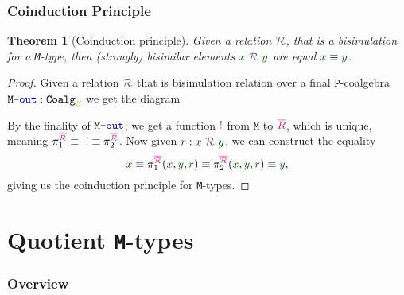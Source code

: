 \documentclass[xelatex,mathserif,serif,notheorems]{beamer} %
\theoremstyle{plain} %
\newtheorem{thm}{Theorem}[section]
\theoremstyle{definition}
\theoremstyle{remark}
\newcommand*{\term}[1]{\textcolor{green!30!black}{#1}} %
\newcommand*{\type}[1]{\textcolor{magenta!90!black}{#1}}
\newcommand*{\container}[1]{\textcolor{orange}{#1}}
\newcommand*{\coalg}[2]{#1\texttt{-}#2}
\newcommand*{\relation}[1]{\textcolor{gray!75!black}{\ensuremath{\mathtt{#1}}}}
\newcommand*{\constant}[1]{\textcolor{orange!60!black}{\ensuremath{\mathtt{#1}}}}
\newcommand*{\function}[1]{\textcolor{blue!60!black}{\ensuremath{\mathtt{#1}}}}
\newcommand*{\typeformer}[1]{\ensuremath{\mathtt{#1}}}
\newcommand*{\functor}[1]{\ensuremath{\mathbf{\mathtt{#1}}}}
\newcommand{\setlengths}{
  \setlength{\abovedisplayskip}{4pt}
  \setlength{\belowdisplayskip}{4pt}
  \setlength{\abovedisplayshortskip}{2pt}
  \setlength{\belowdisplayshortskip}{2pt}
}
\begin{document}
\begin{frame}[fragile]
  \frametitle{Coinduction Principle}
  \begin{thm}[Coinduction principle]\setlengths
    Given a relation \(\relation{\mathcal{R}}\), that is a bisimulation for a \texttt{M}-type, then (strongly) bisimilar elements \(\term{x}~\relation{\mathcal{R}}~\term{y}\) are equal \(\term{x} \equiv \term{y}\).
  \end{thm}
  \begin{proof}\setlengths
    Given a relation \(\relation{\mathcal{R}}\) that is bisimulation relation over a final \(\functor{P}\)-coalgebra \(\coalg{\typeformer{M}}{\function{out}}:\mathtt{Coalg}_{\container{S}}\) we get the diagram
    \begin{figure}[h]
      \centering
    \end{figure}
    By the finality of \(\coalg{\typeformer{M}}{\function{out}}\), we get a function \(\constant{!}\) from \(\typeformer{M}\) to \(\type{\overline{R}}\), which is unique, meaning \(\pi_1^{\type{\overline{\mathcal{R}}}} \equiv ~\constant{!} \equiv \pi_2^{\type{\overline{\mathcal{R}}}}\). Now given \(\term{r} : \term{x}~\relation{\mathcal{R}}~\term{y}\), we can construct the equality
    \begin{equation}
      \term{x} \equiv \pi_1^{\type{\overline{\mathcal{R}}}} (\term{x}, \term{y}, \term{r}) \equiv \pi_2^{\type{\overline{\mathcal{R}}}} (\term{x}, \term{y}, \term{r}) \equiv \term{y},
    \end{equation}
    giving us the coinduction principle for \texttt{M}-types.
  \end{proof}  
\end{frame}

\section{Quotient \texttt{M}-types}
\begin{frame}
  \frametitle{Overview}
  \tableofcontents[currentsection]
\end{frame}
\end{document}

